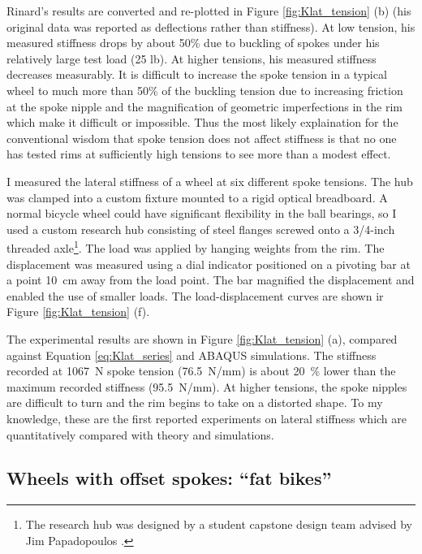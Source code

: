 \documentclass[\rootdir/thesis.tex]{subfiles}
\begin{document}
Rinard's results are converted and re-plotted in Figure \ref{fig:Klat_tension} (b) (his original data was reported as deflections rather than stiffness). At low tension, his measured stiffness drops by about 50\% due to buckling of spokes under his relatively large test load (25 lb). At higher tensions, his measured stiffness decreases measurably. It is difficult to increase the spoke tension in a typical wheel to much more than 50\% of the buckling tension due to increasing friction at the spoke nipple and the magnification of geometric imperfections in the rim which make it difficult or impossible. Thus the most likely explaination for the conventional wisdom that spoke tension does not affect stiffness is that no one has tested rims at sufficiently high tensions to see more than a modest effect.

I measured the lateral stiffness of a wheel at six different spoke tensions. The hub was clamped into a custom fixture mounted to a rigid optical breadboard. A normal bicycle wheel could have significant flexibility in the ball bearings, so I used a custom research hub consisting of steel flanges screwed onto a 3/4-inch threaded axle\footnote{The research hub was designed by a student capstone design team advised by Jim Papadopoulos \cite{Alim2016}.}. The load was applied by hanging weights from the rim. The displacement was measured using a dial indicator positioned on a pivoting bar at a point \SI{10}{cm} away from the load point. The bar magnified the displacement and enabled the use of smaller loads. The load-displacement curves are shown ir Figure \ref{fig:Klat_tension} (f).

The experimental results are shown in Figure \ref{fig:Klat_tension} (a), compared against Equation \eqref{eq:Klat_series} and ABAQUS simulations. The stiffness recorded at \SI{1067}{N} spoke tension (\SI{76.5}{N/mm}) is about \SI{20}{\percent} lower than the maximum recorded stiffness (\SI{95.5}{N/mm}). At higher tensions, the spoke nipples are difficult to turn and the rim begins to take on a distorted shape. To my knowledge, these are the first reported experiments on lateral stiffness which are quantitatively compared with theory and simulations.


\subsection{Wheels with offset spokes: ``fat bikes''}
\inprogress
\end{document}
